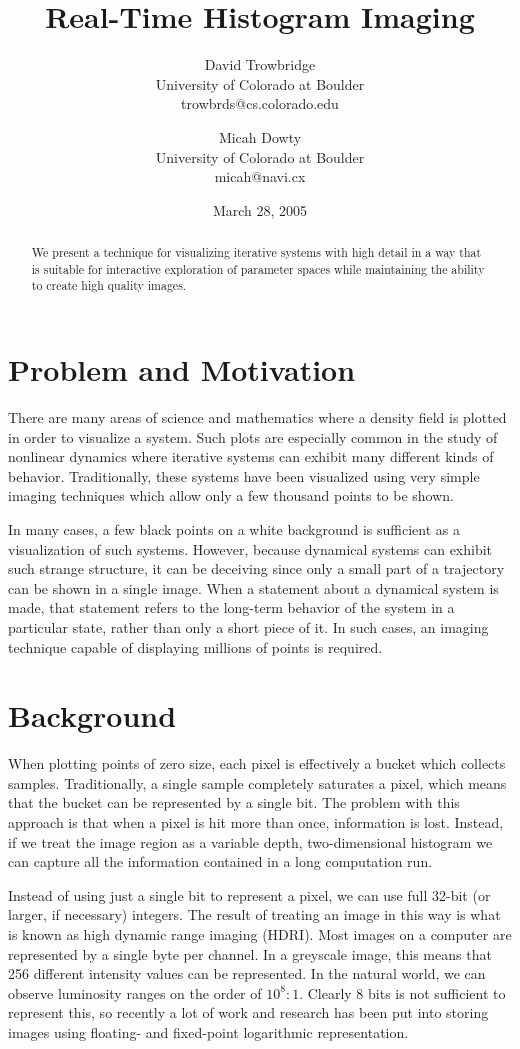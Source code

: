 \documentclass[letterpaper, 11pt]{article}
\title{Real-Time Histogram Imaging}
\author{
	David Trowbridge \\ University of Colorado at Boulder \\ trowbrds@cs.colorado.edu
\and
	Micah Dowty \\ University of Colorado at Boulder \\ micah@navi.cx
}
\date{March 28, 2005}
\begin{document}
\maketitle

\begin{abstract}
We present a technique for visualizing iterative systems with high detail in a way that
is suitable for interactive exploration of parameter spaces while maintaining the ability
to create high quality images.
\end{abstract}

\section{Problem and Motivation}
There are many areas of science and mathematics where a density field is plotted in order
to visualize a system.  Such plots are especially common in the study of nonlinear dynamics
where iterative systems can exhibit many different kinds of behavior.  Traditionally, these
systems have been visualized using very simple imaging techniques which allow only a few
thousand points to be shown.

In many cases, a few black points on a white background is sufficient as a visualization
of such systems.  However, because dynamical systems can exhibit such strange structure,
it can be deceiving since only a small part of a trajectory can be shown in a single image.
When a statement about a dynamical system is made, that statement refers to the long-term
behavior of the system in a particular state, rather than only a short piece of it.  In such
cases, an imaging technique capable of displaying millions of points is required.

\section{Background}
When plotting points of zero size, each pixel is effectively a bucket which collects samples.
Traditionally, a single sample completely saturates a pixel, which means that the bucket
can be represented by a single bit.  The problem with this approach is that when a pixel is
hit more than once, information is lost.  Instead, if we treat the image region as a variable
depth, two-dimensional histogram we can capture all the information contained in a long
computation run.

Instead of using just a single bit to represent a pixel, we can use full 32-bit (or larger,
if necessary) integers.  The result of treating an image in this way is what is known as
high dynamic range imaging (HDRI).  Most images on a computer are represented by a single
byte per channel.  In a greyscale image, this means that 256 different intensity values
can be represented.  In the natural world, we can observe luminosity ranges on the order of
$10^8:1$.  Clearly 8 bits is not sufficient to represent this, so recently a lot of work
and research has been put into storing images using floating- and fixed-point logarithmic
representation.
\end{document}
